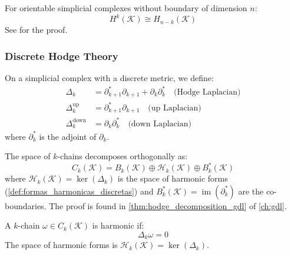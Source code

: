 \begin{theorem}\label{thm:dualidad_poincare_complejos}
For orientable simplicial complexes without boundary of dimension $n$:
\begin{equation}
    H^k(\mathcal{K}) \cong H_{n-k}(\mathcal{K})
\end{equation}
See \citep{Hatcher2002} for the proof.
\end{theorem}

\subsubsection{Discrete Hodge Theory}

\begin{definition}\label{def:operadores_hodge_discretos}
On a simplicial complex with a discrete metric, we define:
\begin{align}
    \Delta_k &= \partial_{k+1}^* \partial_{k+1} + \partial_k \partial_k^* \quad \text{(Hodge Laplacian)} \\
    \Delta_k^{\text{up}} &= \partial_{k+1}^* \partial_{k+1} \quad \text{(up Laplacian)} \\
    \Delta_k^{\text{down}} &= \partial_k \partial_k^* \quad \text{(down Laplacian)}
\end{align}
where $\partial_k^*$ is the adjoint of $\partial_k$.
\end{definition}

\begin{theorem}\label{thm:descomposicion_hodge_discreta}
The space of $k$-chains decomposes orthogonally as:
\begin{equation}
    C_k(\mathcal{K}) = B_k(\mathcal{K}) \oplus \mathcal{H}_k(\mathcal{K}) \oplus B_k^*(\mathcal{K})
\end{equation}
where $\mathcal{H}_k(\mathcal{K}) = \ker(\Delta_k)$ is the space of harmonic forms (\autoref{def:formas_harmonicas_discretas}) and $B_k^*(\mathcal{K}) = \operatorname{im}(\partial_k^*)$ are the co-boundaries. The proof is found in \autoref{thm:hodge_decomposition_gdl} of \autoref{ch:gdl}.
\end{theorem}

\begin{definition}\label{def:formas_harmonicas_discretas}
A $k$-chain $\omega \in C_k(\mathcal{K})$ is harmonic if:
\begin{equation}
    \Delta_k \omega = 0
\end{equation}
The space of harmonic forms is $\mathcal{H}_k(\mathcal{K}) = \ker(\Delta_k)$.
\end{definition}

